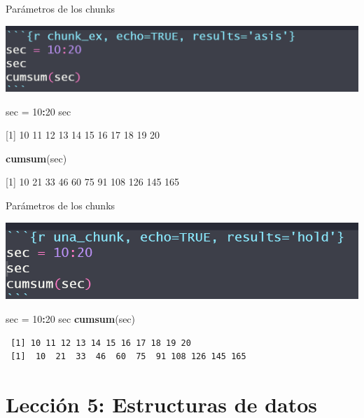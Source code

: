 \documentclass[
  ignorenonframetext,
  aspectratio=169]{beamer}
\newenvironment{Shaded}{\begin{snugshade}}{\end{snugshade}}
\newcommand{\DecValTok}[1]{\textcolor[rgb]{0.00,0.00,0.81}{#1}}
\newcommand{\FunctionTok}[1]{\textcolor[rgb]{0.13,0.29,0.53}{\textbf{#1}}}
\newcommand{\NormalTok}[1]{#1}
\newcommand{\OtherTok}[1]{\textcolor[rgb]{0.56,0.35,0.01}{#1}}
\newcommand{\SpecialCharTok}[1]{\textcolor[rgb]{0.81,0.36,0.00}{\textbf{#1}}}
\begin{document}
\begin{frame}[fragile]{Parámetros de los chunks}
\label{paruxe1metros-de-los-chunks-8}
\begin{center}\includegraphics[width=0.3\linewidth]{Imgs/parametros_chunk_5} \end{center}

\begin{Shaded}
\begin{Highlighting}[]
\NormalTok{sec }\OtherTok{=} \DecValTok{10}\SpecialCharTok{:}\DecValTok{20}
\NormalTok{sec}
\end{Highlighting}
\end{Shaded}

{[}1{]} 10 11 12 13 14 15 16 17 18 19 20

\begin{Shaded}
\begin{Highlighting}[]
\FunctionTok{cumsum}\NormalTok{(sec)}
\end{Highlighting}
\end{Shaded}

{[}1{]} 10 21 33 46 60 75 91 108 126 145 165
\end{frame}

\begin{frame}[fragile]{Parámetros de los chunks}
\label{paruxe1metros-de-los-chunks-9}
\begin{center}\includegraphics[width=0.3\linewidth]{Imgs/parametros_chunk_6} \end{center}

\begin{Shaded}
\begin{Highlighting}[]
\NormalTok{sec }\OtherTok{=} \DecValTok{10}\SpecialCharTok{:}\DecValTok{20}
\NormalTok{sec}
\FunctionTok{cumsum}\NormalTok{(sec)}
\end{Highlighting}
\end{Shaded}

\begin{verbatim}
 [1] 10 11 12 13 14 15 16 17 18 19 20
 [1]  10  21  33  46  60  75  91 108 126 145 165
\end{verbatim}
\end{frame}

\section{Lección 5: Estructuras de
datos}\label{lecciuxf3n-5-estructuras-de-datos}
\end{document}
